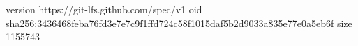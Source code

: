 version https://git-lfs.github.com/spec/v1
oid sha256:3436468feba76fd3e7e7c9f1ffd724c58f1015daf5b2d9033a835e77e0a5eb6f
size 1155743
